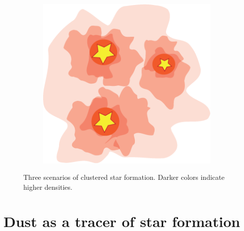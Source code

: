 \begin{figure}[ht!]
\begin{center}
\begin{subfigure}[b]{0.3\textwidth}
\caption{}
\label{subfig:scenarios:b}
\end{subfigure}
\begin{subfigure}[b]{0.3\textwidth}
\centering
\includegraphics[width=0.98\textwidth]{Figures/Coalescence.png} 
\caption{}
\label{subfig:scenarios:c}
\end{subfigure}
\caption[Scenarios of clustered star formation]{Three scenarios of clustered star formation. Darker colors indicate higher densities.}
\label{fig:SFscenarios}
\end{center}
\end{figure}



%

\section{Dust as a tracer of star formation}
\label{subsec:dust}

